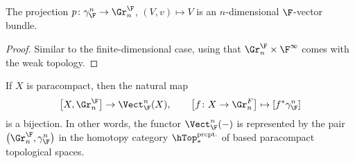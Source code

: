\begin{lemma}
	The projection $p\colon \gamma^n_{\F} \to \Gr_n^{\F}$, $(V, v) \mapsto V$ is an $n$-dimensional $\F$-vector bundle.
\end{lemma}
\begin{proof}
	Similar to the finite-dimensional case, using that $\Gr_n^{\F} \times \F^\infty$ comes with the weak topology.
\end{proof}
\begin{theorem}\label{thm:vecbunrepresentability}
	If $X$ is paracompact, then the natural map
	\begin{equation*}
		\big[X, \Gr_n^{\F}\big] \to \Vect_{\F}^n(X), \qquad \big[f\colon X \to \Gr^{F}_n\big] \mapsto [f^* \gamma_{\F}^n]
	\end{equation*}
	is a bijection.
	In other words, the functor $\Vect_{\F}^n({{-}})$ is represented by the pair $\big(\Gr_n^{\F}, \gamma_{\F}^n\big)$ in the homotopy category $\hToprcpt_*$ of based paracompact topological spaces.
\end{theorem}
